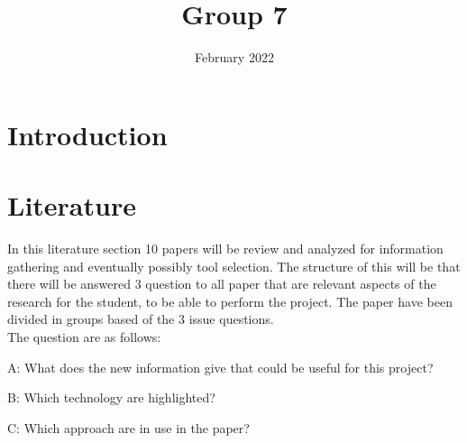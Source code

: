 \documentclass{article}
\title{Group 7}
\date{February 2022}
\begin{document}
\maketitle

\section{Introduction}
\section{Literature}
In this literature section 10 papers will be review and analyzed for information gathering and eventually possibly tool selection. The structure of this will be that there will be answered 3 question to all paper that are relevant aspects of the research for the student, to be able to perform the project. The paper have been divided in groups based of the 3 issue questions. 
\\The question are as follows:
	\par A: What does the new information give that could be useful for this project?
	\par B: Which technology are highlighted?
	\par C: Which approach are in use in the paper?
\end{document}
